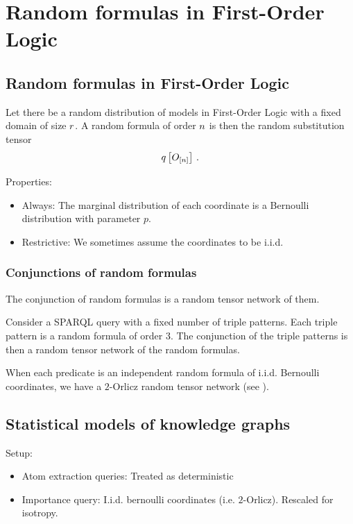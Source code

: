 \section{Random formulas in First-Order Logic}


\subsection{Random formulas in First-Order Logic}

Let there be a random distribution of models in First-Order Logic with a fixed domain of size $r$.
A random formula of order $n$ is then the random substitution tensor
\begin{align*}
    q\left[O_{[n]}\right] \, .
\end{align*}

Properties:
\begin{itemize}
    \item Always: The marginal distribution of each coordinate is a Bernoulli distribution with parameter $p$.
    \item Restrictive: We sometimes assume the coordinates to be i.i.d.
\end{itemize}


\subsubsection{Conjunctions of random formulas}

The conjunction of random formulas is a random tensor network of them.


\begin{example}
    Consider a SPARQL query with a fixed number of triple patterns.
    Each triple pattern is a random formula of order $3$.
    The conjunction of the triple patterns is then a random tensor network of the random formulas.
\end{example}

When each predicate is an independent random formula of i.i.d. Bernoulli coordinates, we have a $2$-Orlicz random tensor network (see \cite{goessmann_uniform_2021}).




\subsection{Statistical models of knowledge graphs}

Setup:
\begin{itemize}
    \item Atom extraction queries: Treated as deterministic
    \item Importance query: I.i.d. bernoulli coordinates (i.e. $2$-Orlicz). Rescaled for isotropy.
\end{itemize}

